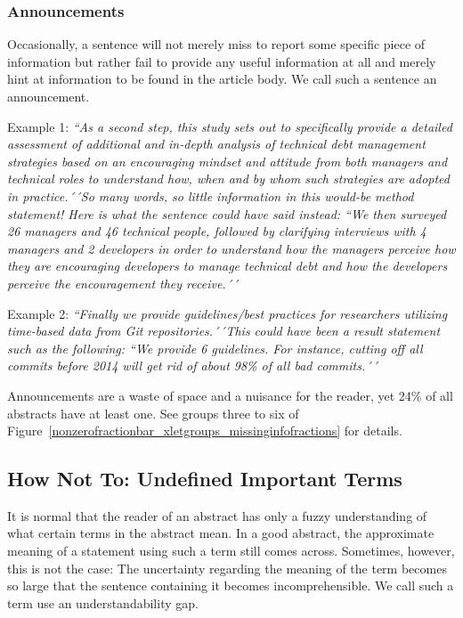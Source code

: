 \documentclass[10pt,journal,compsoc]{IEEEtran}
\newcommand{\Quote}[1]{\bgroup\itshape ``#1´´\egroup}
\newcommand{\Pseudoquote}[1]{\bgroup\itshape ``#1´´\egroup}
\begin{document}
\subsubsection{Announcements}

Occasionally, a sentence will not merely miss to report some specific piece of information
but rather fail to provide any useful information at all and merely hint at
information to be found in the article body.
We call such a sentence an announcement.

Example 1:
\Quote{As a second step, this study sets out to specifically
  provide a detailed assessment of additional and in-depth analysis of technical debt management strategies based
  on an encouraging mindset and attitude from both managers and technical roles to understand how, when and by
  whom such strategies are adopted in practice.} [BesMarBos22]
So many words, so little information in this would-be method statement!
Here is what the sentence could have said instead:
\Pseudoquote{We then surveyed 26 managers and 46 technical people, followed by clarifying interviews 
  with 4 managers and 2 developers in order to understand how the managers perceive how they are encouraging
  developers to manage technical debt and how the developers perceive the encouragement they receive.}

Example 2:
\Quote{Finally we provide guidelines/best practices for researchers utilizing time-based data
from Git repositories.} [FliChaDye22]  %
This could have been a result statement such as the following:
\Pseudoquote{We provide 6 guidelines. For instance, cutting off all commits before 2014
  will get rid of about 98\% of all bad commits.}

Announcements are a waste of space and a nuisance for the reader, 
yet 24\% of all abstracts have at least one.
See groups three to six of Figure~\ref{nonzerofractionbar_xletgroups_missinginfofractions} 
for details.


\subsection{How Not To: Undefined Important Terms}

It is normal that the reader of an abstract has only a fuzzy understanding
of what certain terms in the abstract mean.
In a good abstract, the approximate meaning of a statement using such a term
still comes across.
Sometimes, however, this is not the case: 
The uncertainty regarding the meaning of the term becomes so large
that the sentence containing it becomes incomprehensible.
We call such a term use an understandability gap.
\end{document}
